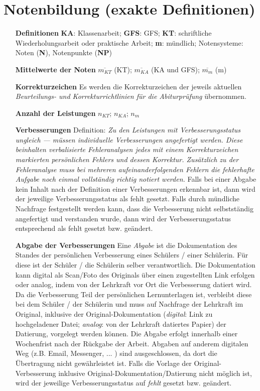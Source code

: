 \section{Notenbildung (exakte Definitionen)}\label{chap:C}
\begin{enumerate}[label=\textbf{\textbullet}, align=left, leftmargin=*]
	\item[\textbf{Definitionen}] { \scriptsize \textbf{KA}: Klassenarbeit; \textbf{GFS}: GFS; \textbf{KT}: schriftliche Wiederholungsarbeit oder praktische Arbeit; \textbf{m}: mündlich; Notensysteme: Noten (\textbf{N}), Notenpunkte (\textbf{NP}) }
	\item[\textbf{Mittelwerte der Noten}] $\overline{m_{KT}}$ (KT); $\overline{m_{KA}}$ (KA und GFS); $\overline{m_{m}}$ (m)
	\item[\textbf{Korrekturzeichen}] Es werden die Korrekturzeichen der jeweils aktuellen \textit{\glqq Beurteilungs- und Korrekturrichtlinien für die Abiturprüfung\grqq{}} übernommen.
	\item[\textbf{Anzahl der Leistungen}] $n_{KT}$; $n_{KA}$; $n_{m}$
	\item[\textbf{Verbesserungen}] { \scriptsize Definition: \glqq\textit{Zu den Leistungen mit Verbesserungsstatus ungleich \glqq ---\grqq{} müssen \textit{individuelle} Verbesserungen angefertigt werden. Diese beinhalten verbalisierte Fehleranalysen jedes mit einem Korrekturzeichen markierten \textit{persönlichen} Fehlers und dessen Korrektur. Zusätzlich zu der Fehleranalyse muss bei mehreren aufeinanderfolgenden Fehlern die fehlerhafte Aufgabe noch einmal vollständig richtig notiert werden.}\grqq{} Falls bei einer Abgabe kein Inhalt nach der Definition einer Verbesserungen erkennbar ist, dann wird der jeweilige Verbesserungsstatus als \glqq fehlt\grqq{} gesetzt.  Falls durch mündliche Nachfrage festgestellt werden kann, dass die Verbesserung nicht selbstständig angefertigt und verstanden wurde, dann wird der Verbesserungsstatus entsprechend als \glqq fehlt\grqq{} gesetzt bzw. geändert.}
	\item[\textbf{Abgabe der Verbesserungen}] { \scriptsize Eine \glqq \textit{Abgabe}\grqq{} ist die Dokumentation des Standes der persönlichen Verbesserung eines Schülers / einer Schülerin. Für diese ist der Schüler / die Schülerin selber verantwortlich. Die Dokumentation kann digital als Scan/Foto des Originals über einen zugestellten Link erfolgen oder analog, indem von der Lehrkraft vor Ort die Verbesserung datiert wird. Da die Verbesserung Teil der persönlichen Lernunterlagen ist, verbleibt diese bei dem Schüler / der Schülerin und muss auf Nachfrage der Lehrkraft im Original, inklusive der Original-Dokumentation (\textit{digital}: Link zu hochgeladener Datei; \textit{analog}: von der Lehrkraft datiertes Papier) der Datierung, vorgelegt werden können. Die Abgabe erfolgt innerhalb einer Wochenfrist nach der Rückgabe der Arbeit. Abgaben auf anderem digitalen Weg (z.B. Email, Messenger, ... ) sind ausgeschlossen, da dort die Übertragung nicht gewährleistet ist. Falls die Vorlage der Original-Verbesserung inklusive Original-Dokumentation/Datierung nicht möglich ist, wird der jeweilige Verbesserungsstatus auf \glqq \textit{fehlt}\grqq{} gesetzt bzw. geändert.} 

\end{enumerate}
